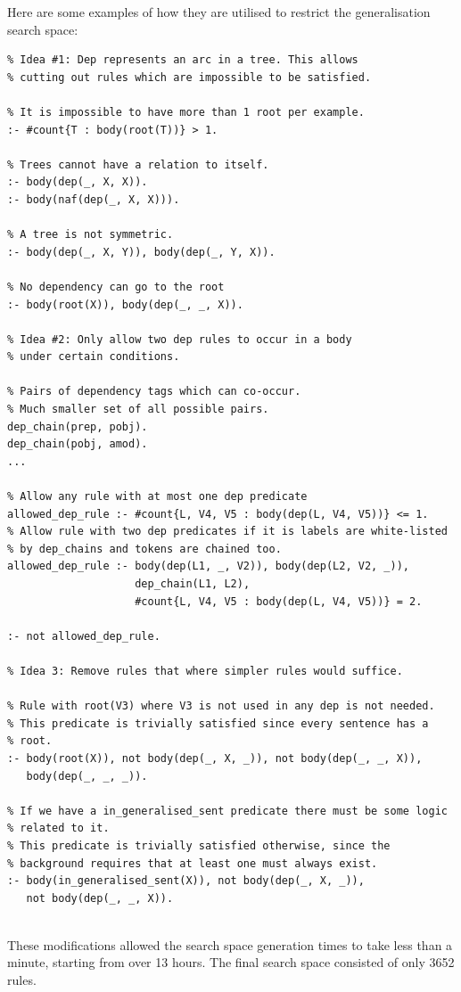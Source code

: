 Here are some examples of how they are utilised to restrict the generalisation search space:
\begin{verbatim}
% Idea #1: Dep represents an arc in a tree. This allows 
% cutting out rules which are impossible to be satisfied.
    
% It is impossible to have more than 1 root per example.
:- #count{T : body(root(T))} > 1.

% Trees cannot have a relation to itself.
:- body(dep(_, X, X)).
:- body(naf(dep(_, X, X))).

% A tree is not symmetric.
:- body(dep(_, X, Y)), body(dep(_, Y, X)).

% No dependency can go to the root
:- body(root(X)), body(dep(_, _, X)).

% Idea #2: Only allow two dep rules to occur in a body
% under certain conditions. 

% Pairs of dependency tags which can co-occur.
% Much smaller set of all possible pairs.
dep_chain(prep, pobj).
dep_chain(pobj, amod).
...

% Allow any rule with at most one dep predicate
allowed_dep_rule :- #count{L, V4, V5 : body(dep(L, V4, V5))} <= 1.
% Allow rule with two dep predicates if it is labels are white-listed
% by dep_chains and tokens are chained too.
allowed_dep_rule :- body(dep(L1, _, V2)), body(dep(L2, V2, _)), 
                    dep_chain(L1, L2), 
                    #count{L, V4, V5 : body(dep(L, V4, V5))} = 2.

:- not allowed_dep_rule.

% Idea 3: Remove rules that where simpler rules would suffice.

% Rule with root(V3) where V3 is not used in any dep is not needed.
% This predicate is trivially satisfied since every sentence has a 
% root.
:- body(root(X)), not body(dep(_, X, _)), not body(dep(_, _, X)), 
   body(dep(_, _, _)).

% If we have a in_generalised_sent predicate there must be some logic 
% related to it.
% This predicate is trivially satisfied otherwise, since the 
% background requires that at least one must always exist.
:- body(in_generalised_sent(X)), not body(dep(_, X, _)), 
   not body(dep(_, _, X)).


\end{verbatim}

These modifications allowed the search space generation times to take less than a minute, starting from over 13 hours.
The final search space consisted of only 3652 rules.


